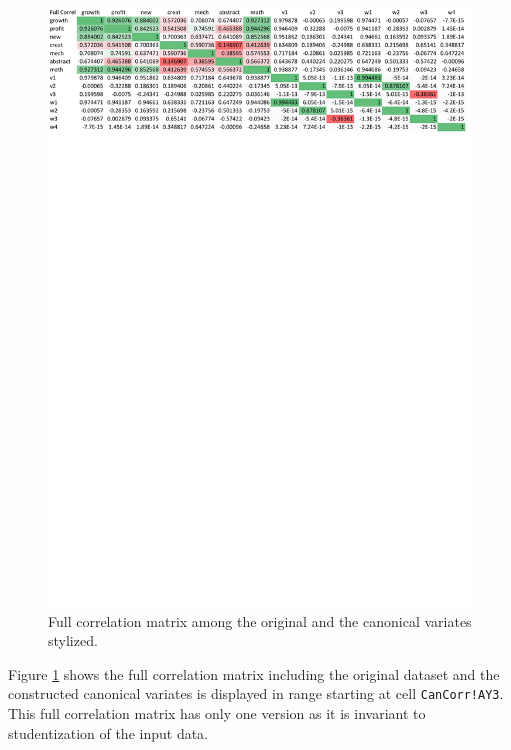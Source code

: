 \documentclass[article]{jss}
\numberwithin{equation}{subsection}
\begin{document}
        \begin{figure}[!tbh]
        	\includegraphics[width=\linewidth, keepaspectratio=true]{img/CanCorrSheetFullCorrel}
        	\vspace{-20pt}\centering{}\protect\caption{Full correlation matrix among the original and the canonical variates stylized.}\label{fig:cancorr full correlation matrix}
        \end{figure}
        Figure \ref{fig:cancorr full correlation matrix} shows the full correlation matrix including the original dataset and the constructed canonical variates is displayed in range starting at cell \texttt{CanCorr!AY3}. This full correlation matrix has only one version as it is invariant to studentization of the input data. 
        
\end{document}
